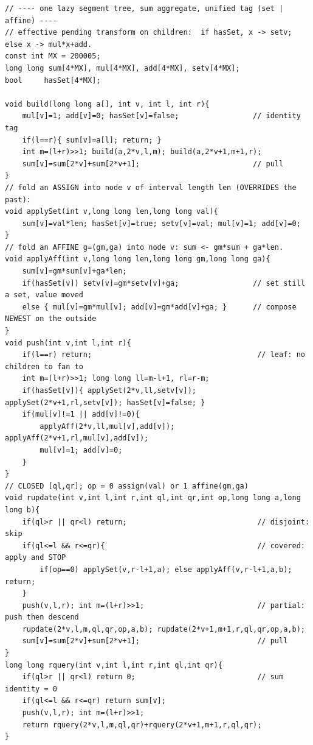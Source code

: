 \begin{lstlisting}[caption={Chapter 20 kit: one recursive lazy tree carrying an add, an affine (mul,add), and an assign-override tag -- apply/push/pull complete and production-shaped}, label={lst:c15-kit}]
// ---- one lazy segment tree, sum aggregate, unified tag (set | affine) ----
// effective pending transform on children:  if hasSet, x -> setv; else x -> mul*x+add.
const int MX = 200005;
long long sum[4*MX], mul[4*MX], add[4*MX], setv[4*MX];
bool     hasSet[4*MX];

void build(long long a[], int v, int l, int r){
    mul[v]=1; add[v]=0; hasSet[v]=false;                 // identity tag
    if(l==r){ sum[v]=a[l]; return; }
    int m=(l+r)>>1; build(a,2*v,l,m); build(a,2*v+1,m+1,r);
    sum[v]=sum[2*v]+sum[2*v+1];                          // pull
}
// fold an ASSIGN into node v of interval length len (OVERRIDES the past):
void applySet(int v,long long len,long long val){
    sum[v]=val*len; hasSet[v]=true; setv[v]=val; mul[v]=1; add[v]=0;
}
// fold an AFFINE g=(gm,ga) into node v: sum <- gm*sum + ga*len.
void applyAff(int v,long long len,long long gm,long long ga){
    sum[v]=gm*sum[v]+ga*len;
    if(hasSet[v]) setv[v]=gm*setv[v]+ga;                 // set still a set, value moved
    else { mul[v]=gm*mul[v]; add[v]=gm*add[v]+ga; }      // compose NEWEST on the outside
}
void push(int v,int l,int r){
    if(l==r) return;                                      // leaf: no children to fan to
    int m=(l+r)>>1; long long ll=m-l+1, rl=r-m;
    if(hasSet[v]){ applySet(2*v,ll,setv[v]); applySet(2*v+1,rl,setv[v]); hasSet[v]=false; }
    if(mul[v]!=1 || add[v]!=0){
        applyAff(2*v,ll,mul[v],add[v]); applyAff(2*v+1,rl,mul[v],add[v]);
        mul[v]=1; add[v]=0;
    }
}
// CLOSED [ql,qr]; op = 0 assign(val) or 1 affine(gm,ga)
void rupdate(int v,int l,int r,int ql,int qr,int op,long long a,long long b){
    if(ql>r || qr<l) return;                              // disjoint: skip
    if(ql<=l && r<=qr){                                   // covered: apply and STOP
        if(op==0) applySet(v,r-l+1,a); else applyAff(v,r-l+1,a,b); return;
    }
    push(v,l,r); int m=(l+r)>>1;                          // partial: push then descend
    rupdate(2*v,l,m,ql,qr,op,a,b); rupdate(2*v+1,m+1,r,ql,qr,op,a,b);
    sum[v]=sum[2*v]+sum[2*v+1];                           // pull
}
long long rquery(int v,int l,int r,int ql,int qr){
    if(ql>r || qr<l) return 0;                            // sum identity = 0
    if(ql<=l && r<=qr) return sum[v];
    push(v,l,r); int m=(l+r)>>1;
    return rquery(2*v,l,m,ql,qr)+rquery(2*v+1,m+1,r,ql,qr);
}
\end{lstlisting}

